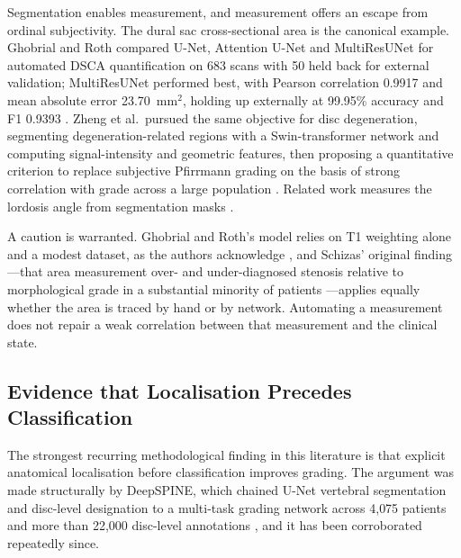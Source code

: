 Segmentation enables measurement, and measurement offers an escape from ordinal
subjectivity. The dural sac cross-sectional area is the canonical example.
Ghobrial and Roth compared U-Net, Attention U-Net and MultiResUNet for automated
DSCA quantification on 683 scans with 50 held back for external validation;
MultiResUNet performed best, with Pearson correlation 0.9917 and mean absolute
error 23.70~mm$^2$, holding up externally at 99.95\% accuracy and F1 0.9393
\cite{ghobrial2025deep}. Zheng et al.\ pursued the same objective for disc
degeneration, segmenting degeneration-related regions with a Swin-transformer
network and computing signal-intensity and geometric features, then proposing a
quantitative criterion to replace subjective Pfirrmann grading on the basis of
strong correlation with grade across a large population \cite{zheng2022deep}.
Related work measures the lordosis angle from segmentation masks
\cite{ji2026mdvmunet}.

A caution is warranted. Ghobrial and Roth's model relies on T1 weighting alone
and a modest dataset, as the authors acknowledge \cite{ghobrial2025deep}, and
Schizas' original finding---that area measurement over- and under-diagnosed
stenosis relative to morphological grade in a substantial minority of patients
\cite{schizas2010qualitative}---applies equally whether the area is traced by
hand or by network. Automating a measurement does not repair a weak correlation
between that measurement and the clinical state.

\subsection{Evidence that Localisation Precedes Classification}
\label{sec:lr-localize-first}

The strongest recurring methodological finding in this literature is that
explicit anatomical localisation before classification improves grading. The
argument was made structurally by DeepSPINE, which chained U-Net vertebral
segmentation and disc-level designation to a multi-task grading network across
4{,}075 patients and more than 22{,}000 disc-level annotations
\cite{lu2018deepspine}, and it has been corroborated repeatedly since.

